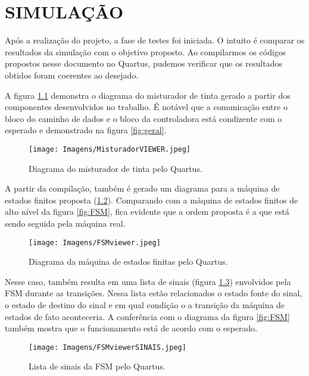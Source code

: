 \documentclass[12pt,a4paper,oneside]{abntex2}
\begin{document}
        \chapter{SIMULAÇÃO}
            Após a realização do projeto, a fase de testes foi iniciada. O intuito é comparar os resultados da simulação com o objetivo proposto. Ao compilarmos os códigos propostos nesse documento no Quartus, pudemos verificar que os resultados obtidos foram coerentes ao desejado. \par
            A figura \ref{fig:MisturadorVIEWER} demonstra o diagrama do misturador de tinta gerado a partir dos componentes desenvolvidos no trabalho. É notável que a comunicação entre o bloco do caminho de dados e o bloco da controladora está condizente com o esperado e demonstrado na figura \ref{fig:geral}. 
            \begin{figure}[H]
                \centering
                \texttt{[image: Imagens/MisturadorVIEWER.jpeg]}
                \caption{Diagrama do misturador de tinta pelo Quartus.}
                \label{fig:MisturadorVIEWER}
            \end{figure}

            A partir da compilação, também é gerado um diagrama para a máquina de estados finitos proposta (\ref{fig:FSMviewer}). Comparando com a máquina de estados finitos de alto nível da figura \ref{fig:FSM}, fica evidente que a ordem proposta é a que está sendo seguida pela máquina real.
            
            \begin{figure}[H]
                \centering
                \texttt{[image: Imagens/FSMviewer.jpeg]}
                \caption{Diagrama da máquina de estados finitas pelo Quartus.}
                \label{fig:FSMviewer}
            \end{figure}

            Nesse caso, também resulta em uma lista de sinais (figura \ref{fig:FSMviewerSINAIS}) envolvidos pela FSM durante as transições. Nessa lista estão relacionados o estado fonte do sinal, o estado de destino do sinal e em qual condição o a transição da máquina de estados de fato aconteceria. A conferência com o diagrama da figura \ref{fig:FSM} também mostra que o funcionamento está de acordo com o esperado.

            \begin{figure}[H]
                \centering
                \texttt{[image: Imagens/FSMviewerSINAIS.jpeg]}
                \caption{Lista de sinais da FSM pelo Quartus.}
                \label{fig:FSMviewerSINAIS}
            \end{figure}
\end{document}
